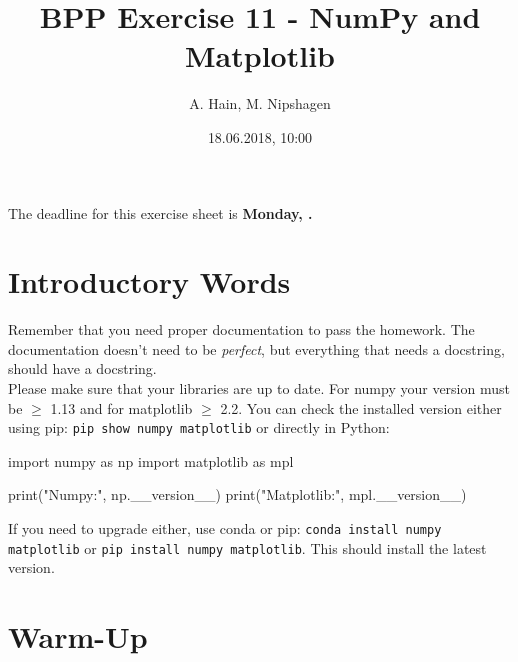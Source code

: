 
\usepackage{setspace}

\title{BPP Exercise 11 - NumPy and Matplotlib}
\author{A. Hain, M. Nipshagen}
\date{18.06.2018, 10:00}


\makeatletter
\let\thetitle\@title
\let\theauthor\@author
\let\thedate\@date
\makeatother


\newcommand\itemsub[1]{
	\begin{itemize}
		\item #1
	\end{itemize}
}





The deadline for this exercise sheet is \textbf{Monday, \thedate.}

\section*{Introductory Words}
Remember that you need proper documentation to pass
the homework. The documentation doesn't need to be \textit{perfect}, but
everything that needs a docstring, should have a docstring.\\

\noindent Please make sure that your libraries are up to date. For numpy your
version must be $\geq$ 1.13 and for matplotlib $\geq$ 2.2. You can check the
installed version either using pip: \verb|pip show numpy matplotlib| or
directly in Python:
\begin{python}
import numpy as np
import matplotlib as mpl

print("Numpy:", np.__version__)
print("Matplotlib:", mpl.__version__)
\end{python}
If you need to upgrade either, use conda or pip: 
\verb|conda install numpy matplotlib| or \verb|pip install numpy matplotlib|.
This should install the latest version.

\section{Warm-Up}
